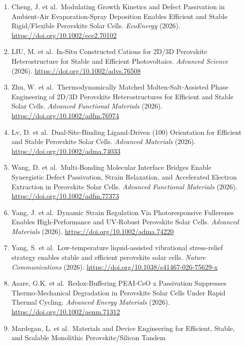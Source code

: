 \documentclass[
  11pt,
]{article}
\begin{document}
\begin{enumerate}
  Du, X. et al.~Enhancing Interfacial Stability of FAPbI 3 Perovskite
  Solar Cells by Introducing 2D/3D Heterojunction Based on Functional
  Imidazolium Cations. \emph{Advanced Functional Materials} (2026).
  \url{https://doi.org/10.1002/adfm.77015}
\item
  Cheng, J. et al.~Modulating Growth Kinetics and Defect Passivation in
  Ambient‐Air Evaporation‐Spray Deposition Enables Efficient and Stable
  Rigid/Flexible Perovskite Solar Cells. \emph{EcoEnergy} (2026).
  \url{https://doi.org/10.1002/ece2.70102}
\item
  LIU, M. et al.~In‐Situ Constructed Cations for 2D/3D Perovskite
  Heterostructure for Stable and Efficient Photovoltaics. \emph{Advanced
  Science} (2026). \url{https://doi.org/10.1002/advs.76508}
\item
  Zhu, W. et al.~Thermodynamically Matched Molten‐Salt‐Assisted Phase
  Engineering of 2D/3D Perovskite Heterostructures for Efficient and
  Stable Solar Cells. \emph{Advanced Functional Materials} (2026).
  \url{https://doi.org/10.1002/adfm.76974}
\item
  Lv, D. et al.~Dual‐Site‐Binding Ligand‐Driven (100) Orientation for
  Efficient and Stable Perovskite Solar Cells. \emph{Advanced Materials}
  (2026). \url{https://doi.org/10.1002/adma.74033}
\item
  Wang, D. et al.~Multi‐Bonding Molecular Interface Bridges Enable
  Synergistic Defect Passivation, Strain Relaxation, and Accelerated
  Electron Extraction in Perovskite Solar Cells. \emph{Advanced
  Functional Materials} (2026). \url{https://doi.org/10.1002/adfm.77373}
\item
  Yang, J. et al.~Dynamic Strain Regulation Via Photoresponsive
  Fullerenes Enables High‐Performance and UV‐Robust Perovskite Solar
  Cells. \emph{Advanced Materials} (2026).
  \url{https://doi.org/10.1002/adma.74220}
\item
  Yang, S. et al.~Low-temperature liquid-assisted vibrational
  stress-relief strategy enables stable and efficient perovskite solar
  cells. \emph{Nature Communications} (2026).
  \url{https://doi.org/10.1038/s41467-026-75629-x}
\item
  Asare, G.K. et al.~Redox‐Buffering PEAI‐CeO x Passivation Suppresses
  Thermo‐Mechanical Degradation in Perovskite Solar Cells Under Rapid
  Thermal Cycling. \emph{Advanced Energy Materials} (2026).
  \url{https://doi.org/10.1002/aenm.71312}
\item
  Mardegan, L. et al.~Materials and Device Engineering for Efficient,
  Stable, and Scalable Monolithic Perovskite/Silicon Tandem

\end{enumerate}
\end{document}
